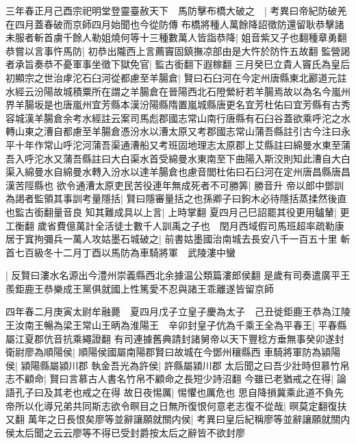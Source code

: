 三年春正月己酉宗祀明堂登靈臺赦天下　馬防擊布橋大破之　|{
	考異曰帝紀防破羌在四月蓋春破而京師四月始聞也今從防傳}
布橋將種人萬餘降詔徵防還留耿恭擊諸未服者斬首虜千餘人勒姐燒何等十三種數萬人皆詣恭降|{
	姐音紫又子也翻種章勇翻}
恭嘗以言事忤馬防|{
	初恭出隴西上言薦竇固鎮撫凉部由是大忤於防忤五故翻}
監營謁者承旨奏恭不憂軍事坐徵下獄免官|{
	監古銜翻下遐稼翻}
三月癸巳立貴人竇氏為皇后　初顯宗之世治虖沱石臼河從都慮至羊腸倉|{
	賢曰石臼河在今定州唐縣東北酈道元註水經云汾陽故城積粟所在謂之羊腸倉在晉陽西北石隥縈紆若羊腸焉故以為名今嵐州界羊腸坂是也唐嵐州宜芳縣本漢汾陽縣隋置嵐城縣唐更名宜芳杜佑曰宜芳縣有古秀容城漢羊腸倉余考水經註云案司馬彪郡國志常山南行唐縣有石臼谷蓋欲乘呼沱之水轉山東之漕自都慮至羊腸倉憑汾水以漕太原又考郡國志常山蒲吾縣註引古今注曰永平十年作常山呼沱河蒲吾渠通漕船又考班固地理志太原郡上艾縣註曰綿曼水東至蒲吾入呼沱水又蒲吾縣註曰大白渠水首受綿曼水東南至下曲陽入斯洨則知此漕自大白渠入綿曼水自綿曼水轉入汾水以達羊腸倉也慮音閭杜佑曰石臼河在定州唐昌縣唐昌漢苦陘縣也}
欲令通漕太原吏民苦役連年無成死者不可勝筭|{
	勝音升}
帝以郎中鄧訓為謁者監領其事訓考量隱括|{
	賢曰隱審量括之也孫卿子曰鉤木必待隱括蒸揉然後直也監古銜翻量音良}
知其難成具以上言|{
	上時掌翻}
夏四月己巳詔罷其役更用驢輦|{
	更工衡翻}
歲省費億萬計全活徒士數千人訓禹之子也　閏月西域假司馬班超率疏勒康居于窴拘彌兵一萬人攻姑墨石城破之|{
	前書姑墨國治南城去長安八千一百五十里}
斬首七百級冬十二月丁酉以馬防為車騎將軍　武陵漊中蠻

|{
	反賢曰漊水名源出今澧州崇義縣西北余據温公類篇漊郎侯翻}
是歲有司奏遣廣平王羨鉅鹿王恭樂成王黨俱就國上性篤愛不忍與諸王乖離遂皆留京師

四年春二月庚寅太尉牟融薨　夏四月戊子立皇子慶為太子　己丑徙鉅鹿王恭為江陵王汝南王暢為梁王常山王昞為淮陽王　辛卯封皇子伉為千乘王全為平春王|{
	平春縣屬江夏郡伉音抗乘繩證翻}
有司連據舊典請封諸舅帝以天下豐稔方垂無事癸卯遂封衛尉廖為順陽侯|{
	順陽侯國屬南陽郡賢曰故城在今鄧州穰縣西}
車騎將軍防為潁陽侯|{
	潁陽縣屬潁川郡}
執金吾光為許侯|{
	許縣屬潁川郡}
太后聞之曰吾少壯時但慕竹帛志不顧命|{
	賢曰言慕古人書名竹帛不顧命之長短少詩沼翻}
今雖已老猶戒之在得|{
	論語孔子曰及其老也戒之在得}
故日夜惕厲|{
	惕懼也厲危也}
思自降損冀乘此道不負先帝所以化導兄弟共同斯志欲令瞑目之日無所復恨何意老志復不從哉|{
	暝莫定翻復扶又翻}
萬年之日長恨矣廖等並辭讓願就關内侯|{
	考異曰皇后紀稱廖等並辭讓願就關内侯太后聞之云云廖等不得已受封爵按太后之辭皆不欲封廖}


